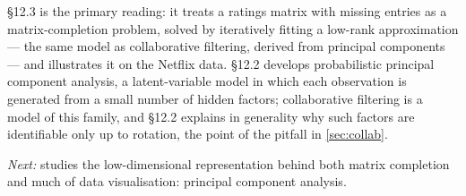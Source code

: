\furtherreading

\textcite{james2021} §12.3 is the primary reading: it treats a ratings matrix with
missing entries as a matrix-completion problem, solved by iteratively fitting a
low-rank approximation --- the same model as collaborative filtering, derived from
principal components --- and illustrates it on the Netflix data.
\textcite{bishop2006} §12.2 develops probabilistic principal component analysis,
a latent-variable model in which each observation is generated from a small
number of hidden factors; collaborative filtering is a model of this family, and
§12.2 explains in generality why such factors are identifiable only up to
rotation, the point of the pitfall in \cref{sec:collab}.

\bigskip
\noindent\emph{Next:}  studies the low-dimensional representation
behind both matrix completion and much of data visualisation: principal component
analysis.
